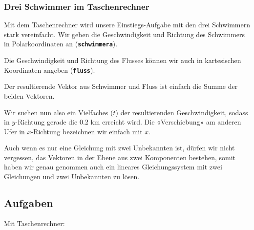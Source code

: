 
\newpage
\subsubsection{Drei Schwimmer im Taschenrechner}
Mit dem Taschenrechner wird unsere Einstiegs-Aufgabe mit den drei
Schwimmern stark vereinfacht. Wir geben die Geschwindigkeit und
Richtung des Schwimmers in Polarkoordinaten an
(\textbf{\texttt{schwimmera}}).

Die Geschwindigkeit und Richtung des Flusses können wir auch in kartesischen
Koordinaten angeben (\texttt{\textbf{fluss}}).

Der resultierende Vektor aus Schwimmer und Fluss ist einfach
die Summe der beiden Vektoren.

Wir suchen nun also ein Vielfaches ($t$) der resultierenden
Geschwindigkeit, sodass in $y$-Richtung gerade die 0.2 km erreicht
wird. Die «Verschiebung» am anderen Ufer in $x$-Richtung bezeichnen
wir einfach mit $x$.


\begin{bemerkung}{}{}
  Auch wenn es nur eine Gleichung mit zwei Unbekannten ist, dürfen wir
  nicht vergessen, das Vektoren in der Ebene aus zwei Komponenten
  bestehen, somit haben wir genau genommen auch ein lineares
  Gleichungssystem mit zwei Gleichungen und zwei Unbekannten zu lösen.
  \end{bemerkung}
\newpage
  
\subsection*{Aufgaben}

Mit Taschenrechner:

\newpage
